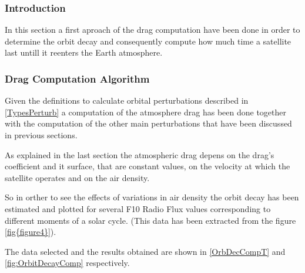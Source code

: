 \subsubsection{Introduction}

In this section a first aproach of the drag computation have been done in order to determine the orbit decay and consequently compute how much time a satellite last untill it reenters the Earth atmosphere.

\subsubsection{Drag Computation Algorithm}

Given the definitions to calculate orbital perturbations described in \ref{TypesPerturb} a computation of the atmosphere drag has been done together with the computation of the other main perturbations that have been discussed in previous sections.

As explained in the last section the atmospheric drag depens on the drag's coefficient and it surface, that are constant values, on the velocity at which the satellite operates and on the air density.

So in orther to see the effects of variations in air density the orbit decay has been estimated and plotted for several F10 Radio Flux values corresponding to different moments of a solar cycle. (This data has been extracted from the figure \ref{fig{figure4}}).

The data selected and the results obtained are shown in \ref{OrbDecCompT} and \ref{fig:OrbitDecayComp} respectively.



